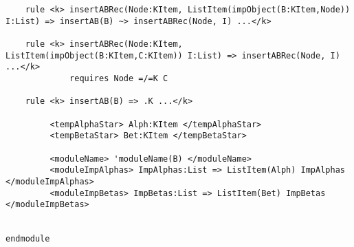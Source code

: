 \begin{lstlisting}
    rule <k> insertABRec(Node:KItem, ListItem(impObject(B:KItem,Node)) I:List) => insertAB(B) ~> insertABRec(Node, I) ...</k>

    rule <k> insertABRec(Node:KItem, ListItem(impObject(B:KItem,C:KItem)) I:List) => insertABRec(Node, I) ...</k>
             requires Node =/=K C

    rule <k> insertAB(B) => .K ...</k>

         <tempAlphaStar> Alph:KItem </tempAlphaStar>
         <tempBetaStar> Bet:KItem </tempBetaStar>

         <moduleName> 'moduleName(B) </moduleName>
         <moduleImpAlphas> ImpAlphas:List => ListItem(Alph) ImpAlphas </moduleImpAlphas>
         <moduleImpBetas> ImpBetas:List => ListItem(Bet) ImpBetas </moduleImpBetas>


endmodule
\end{lstlisting}